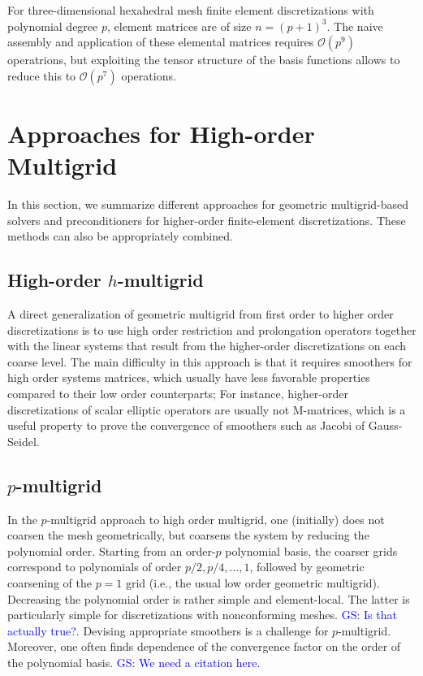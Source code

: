 \documentclass[times]{nlaauth}
\newcommand{\gsnote}[1]{\textcolor{blue}{GS: #1}}
\begin{document}
For three-dimensional hexahedral mesh finite element discretizations
with polynomial degree $p$, element matrices are of size
$n=(p+1)^3$. The naive assembly and application of these elemental
matrices requires $\mathcal O(p^9)$ operatrions, but exploiting the
tensor structure of the basis functions allows to reduce this to
$\mathcal O(p^7)$ operations.


\section{Approaches for High-order Multigrid}


In this section, we summarize different approaches for geometric
multigrid-based solvers and preconditioners for higher-order
finite-element discretizations. These methods can also be
appropriately combined.

\subsection{High-order $h$-multigrid}\label{subsec:h}
A direct generalization of geometric multigrid from first order to
higher order discretizations is to use high order restriction and
prolongation operators together with the linear systems that result
from the higher-order discretizations on each coarse level.  The main
difficulty in this approach is that it requires smoothers for high
order systems matrices, which usually have less favorable properties
compared to their low order counterparts; For instance, higher-order
discretizations of scalar elliptic operators are usually not
M-matrices, which is a useful property to prove the convergence of
smoothers such as Jacobi of Gauss-Seidel.


\subsection{$p$-multigrid}\label{subsec:p}
In the $p$-multigrid approach to high order multigrid, one (initially)
does not coarsen the mesh geometrically, but coarsens the system by
reducing the polynomial 
order. Starting from an order-$p$ polynomial basis, the coarser grids
correspond to polynomials of order $p/2, p/4,\ldots,1$, followed by
geometric coarsening of the $p=1$ grid (i.e., the usual low order
geometric multigrid). Decreasing the polynomial order is rather simple
and element-local. The latter is particularly simple for
discretizations with nonconforming meshes. \gsnote{Is that actually
  true?}. Devising appropriate smoothers is a challenge for $p$-multigrid.
Moreover, one often finds dependence of the convergence
factor on the order of the polynomial basis. \gsnote{We need a
  citation here.}
\end{document}
